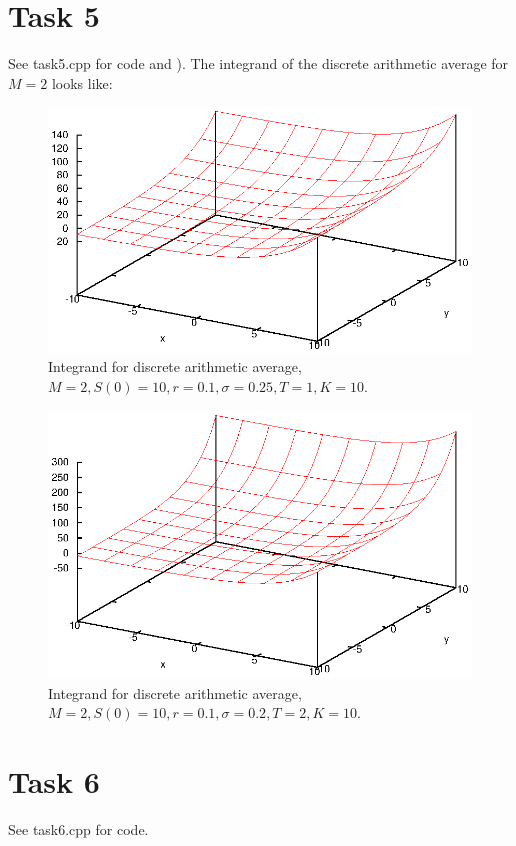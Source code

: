 \documentclass[]{article}
\begin{document}
\section*{Task 5} See task5.cpp for code and ). The
integrand of the discrete arithmetic average for $M=2$ looks like:
\begin{figure}[!ht]
\includegraphics[width=.9\textwidth]{task5_1}
\caption{Integrand for discrete arithmetic average, $M=2, S(0)=10, r=0.1,
\sigma=0.25, T=1, K=10$.}
\label{fig:Task5a}
\end{figure}
\begin{figure}[!ht]
\includegraphics[width=.9\textwidth]{task5_2}
\caption{Integrand for discrete arithmetic average, $M=2, S(0)=10, r=0.1,
\sigma=0.2, T=2, K=10$.}
\label{fig:Task5b}
\end{figure}
\clearpage


\section*{Task 6}
See task6.cpp for code.
\end{document}
